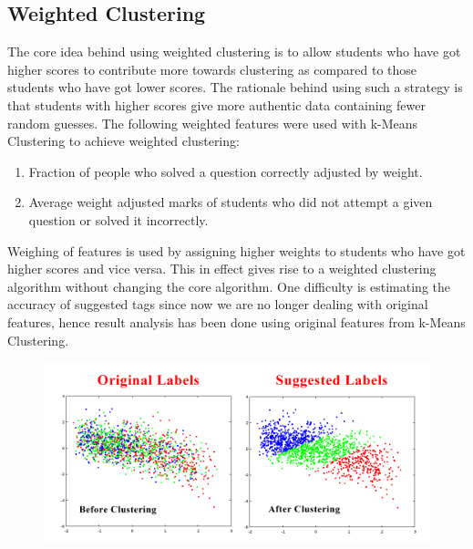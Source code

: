 \documentclass[12pt]{article}
\begin{document}
	
	\newpage
	\subsection{Weighted Clustering}
	The core idea behind using weighted clustering is to allow students
	who have got higher scores to contribute more towards clustering as
	compared to those students who have got lower scores. The rationale
	behind using such a strategy is that students with higher scores give
	more authentic data containing fewer random guesses. The following
	weighted features were used with k-Means Clustering to achieve weighted
	clustering:
	\begin{enumerate}
	\item Fraction of people who solved a question correctly adjusted by weight.
	\item Average weight adjusted marks of students who did not attempt a given 
	question or solved it incorrectly.
	\end{enumerate}
	
	Weighing of features is used by assigning higher weights to students who
	have got higher scores and vice versa. This in effect gives rise to a 
	weighted clustering algorithm without changing the core algorithm. One
	difficulty is estimating the accuracy of suggested tags since now we
	are no longer dealing with original features, hence result analysis has been
	done using original features from k-Means Clustering.
	\begin{figure}[h]
	\includegraphics[width=\textwidth]{WeightedClusteringOutput}
	\end{figure}
	
\end{document}
